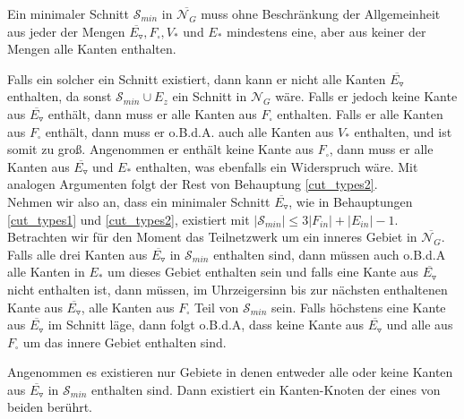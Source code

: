 \begin{claim}\label{cut_types2}

Ein minimaler Schnitt $\mathcal{S}_{min}$ in $\overline{\mathcal{N}_G}$ muss ohne Beschränkung der Allgemeinheit aus jeder der Mengen $\overline{E_\triangledown}, F_\square, V_*$ und $E_*$ mindestens eine, aber aus keiner der Mengen alle Kanten enthalten.

\end{claim}

Falls ein solcher ein Schnitt existiert, dann kann er nicht alle Kanten $\overline{E_\triangledown}$ enthalten, da sonst $\mathcal{S}_{min} \cup E_z$ ein Schnitt in $\mathcal{N}_G$ wäre. Falls er jedoch keine Kante aus $\overline{E_\triangledown}$ enthält, dann muss er alle Kanten aus $F_\square$ enthalten. Falls er alle Kanten aus $F_\square$ enthält, dann muss er o.B.d.A. auch alle Kanten aus $V_*$ enthalten, und ist somit zu groß. Angenommen er enthält keine Kante aus $F_\square$, dann muss er alle Kanten aus $\overline{E_\triangledown}$ und $E_*$ enthalten, was ebenfalls ein Widerspruch wäre. Mit analogen Argumenten folgt der Rest von Behauptung \ref{cut_types2}. \\

Nehmen wir also an, dass ein minimaler Schnitt $\overline{E_\triangledown}$, wie in Behauptungen \ref{cut_types1} und \ref{cut_types2}, existiert mit $|\mathcal{S}_{min}| \leq 3|F_{in}| + |E_{in}| - 1$. Betrachten wir für den Moment das Teilnetzwerk um ein inneres Gebiet in $\overline{\mathcal{N}_G}$. Falls alle drei Kanten aus $\overline{E_\triangledown}$ in $\mathcal{S}_{min}$ enthalten sind, dann müssen auch o.B.d.A alle Kanten in $E_*$ um dieses Gebiet enthalten sein und falls eine Kante aus $\overline{E_\triangledown}$ nicht enthalten ist, dann müssen, im Uhrzeigersinn bis zur nächsten enthaltenen Kante aus $\overline{E_\triangledown}$, alle Kanten aus $F_\square$ Teil von $\mathcal{S}_{min}$ sein. Falls höchstens eine Kante aus $\overline{E_\triangledown}$ im Schnitt läge, dann folgt o.B.d.A, dass keine Kante aus $\overline{E_\triangledown}$ und alle aus $F_\square$ um das innere Gebiet enthalten sind. 

Angenommen es existieren nur Gebiete in denen entweder alle oder keine Kanten aus $\overline{E_\triangledown}$ in $\mathcal{S}_{min}$ enthalten sind. Dann existiert ein Kanten-Knoten der eines von beiden berührt.

